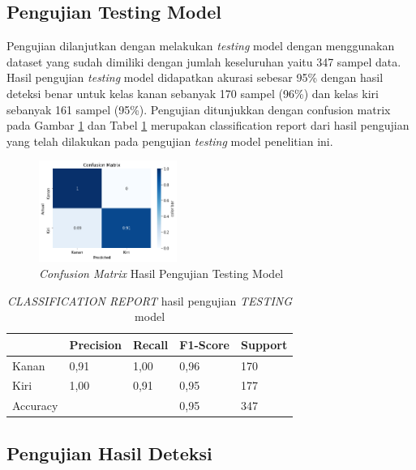 \subsection{Pengujian Testing Model}
\label{subsec:PengujianTesting}

Pengujian dilanjutkan dengan melakukan \emph{testing} model dengan menggunakan dataset yang sudah dimiliki dengan jumlah keseluruhan yaitu 347 sampel data. Hasil pengujian \emph{testing} model didapatkan akurasi sebesar 95\% dengan hasil deteksi benar untuk kelas kanan sebanyak 170 sampel (96\%) dan kelas kiri sebanyak 161 sampel (95\%). Pengujian ditunjukkan dengan confusion matrix pada Gambar \ref{fig:HasilTesting} dan Tabel \ref{tab:ClassificationReport} merupakan classification report dari hasil pengujian yang telah dilakukan pada pengujian \emph{testing} model penelitian ini.

\begin{figure} [ht]
  \centering
  \includegraphics[width=0.4\textwidth]{gambar/cm normalized.png}
  \caption{\emph{Confusion Matrix} Hasil Pengujian Testing Model}
  \label{fig:HasilTesting}
\end{figure}

\begin{table}
  \caption{\emph{CLASSIFICATION REPORT} hasil pengujian \emph{TESTING} model}
  \label{tab:ClassificationReport}
  \centering
  \begin{tabular}{lllll}
    \toprule
     & Precision & Recall & F1-Score & Support  \\
    \midrule
    Kanan       & 0,91    & 1,00    & 0,96    & 170         \\
    Kiri        & 1,00    & 0,91    & 0,95    & 177           \\
    Accuracy    &         &         & 0,95    & 347            \\
    \bottomrule
  \end{tabular}
\end{table}

\subsection{Pengujian Hasil Deteksi}
\label{subsec:PengujianDeteksi}

